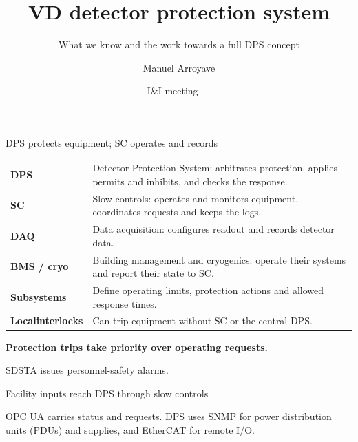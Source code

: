\documentclass[aspectratio=169,11pt]{beamer}
\title{VD detector protection system}
\subtitle{What we know and the work towards a full DPS concept}
\author{Manuel Arroyave}
\date{I\&I meeting --- \DpsMeetingDate}
\begin{document}
\begin{frame}
  \titlepage
\end{frame}

\DpsKnownAndMissing

\begin{frame}{DPS protects equipment; SC operates and records}
\renewcommand{\arraystretch}{1.18}
\begin{tabularx}{\textwidth}{@{}>{\RaggedRight\arraybackslash}p{2.2cm}>{\RaggedRight\arraybackslash}X@{}}
\textbf{DPS} & Detector Protection System: arbitrates protection, applies permits and inhibits, and checks the response.\\
\textbf{SC} & Slow controls: operates and monitors equipment, coordinates requests and keeps the logs.\\
\textbf{DAQ} & Data acquisition: configures readout and records detector data.\\
\textbf{BMS / cryo} & Building management and cryogenics: operate their systems and report their state to SC.\\
\textbf{Subsystems} & Define operating limits, protection actions and allowed response times.\\
\textbf{Local\newline interlocks} & Can trip equipment without SC or the central DPS.\\
\end{tabularx}\par\bigskip
\textbf{Protection trips take priority over operating requests.}\par\medskip
SDSTA issues personnel-safety alarms.
\end{frame}

\DpsFireScope

\begin{frame}{Facility inputs reach DPS through slow controls}
\centering
{}\par\smallskip
\raggedright{}\par\smallskip
\raggedright

OPC UA carries status and requests. DPS uses SNMP for power distribution units (PDUs) and supplies, and EtherCAT for remote I/O.
\end{frame}
\end{document}
